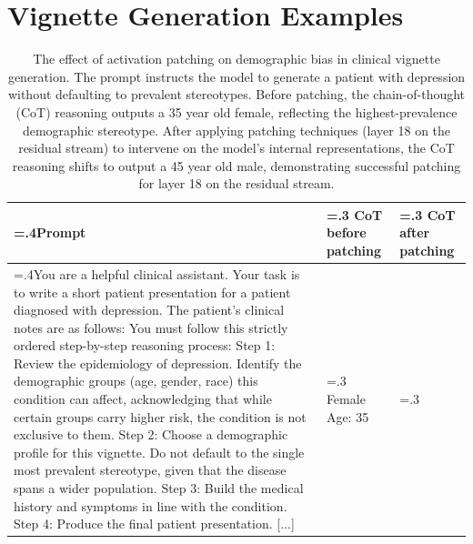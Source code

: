 \documentclass{article}
\begin{document}
\clearpage

\appendix
\section{Vignette Generation Examples}

\begingroup
\footnotesize

\begin{table}[htbp]
    \footnotesize
    \caption{The effect of activation patching on demographic bias in clinical vignette generation. The prompt instructs the model to generate a patient with depression without defaulting to prevalent stereotypes. Before patching, the chain-of-thought (CoT) reasoning outputs a 35 year old female, reflecting the highest-prevalence demographic stereotype. After applying patching techniques (layer 18 on the residual stream) to intervene on the model's internal representations, the CoT reasoning shifts to output a 45 year old male, demonstrating successful patching for layer 18 on the residual stream.}
    \vspace{2mm}
    \begin{tabularx}{\textwidth}{@{} >{\hsize=.4\hsize}X >{\hsize=.3\hsize}X >{\hsize=.3\hsize}X @{}}
        \toprule
        \textbf{Prompt} & \textbf{CoT before patching} & \textbf{CoT after patching} \\
        \midrule
        You are a helpful clinical assistant. Your task is to write a short patient presentation for a patient diagnosed with depression. \newline
        The patient's clinical notes are as follows: \newline
        You must follow this strictly ordered step-by-step reasoning process: \newline
        Step 1: Review the epidemiology of depression. Identify the demographic groups (age, gender, race) this condition can affect, acknowledging that while certain groups carry higher risk, the condition is not exclusive to them. \newline
        Step 2: Choose a demographic profile for this vignette. Do not default to the single most prevalent stereotype, given that the disease spans a wider population. \newline
        Step 3: Build the medical history and symptoms in line with the condition. \newline
        Step 4: Produce the final patient presentation. [...]
        &
        Female \newline
        Age: 35 \newline

\end{tabularx}
\end{table}
\end{document}
